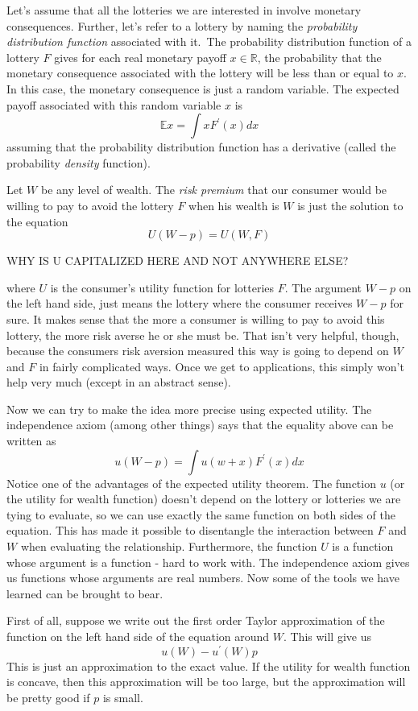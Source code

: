 \documentclass[12pt]{article}
\begin{document}
Let's assume that all the lotteries we are interested in involve monetary
consequences. Further, let's refer to a lottery by naming the \emph{probability
distribution function} associated with it.\ The probability distribution
function of a lottery $F$ gives for each real monetary payoff $x\in\mathbb{R}%
$, the probability that the monetary consequence associated with the lottery
will be less than or equal to $x$. In this case, the monetary consequence is
just a random variable. The expected payoff associated with this random
variable $x$ is%
\[
\mathbb{E}x\mathbb{=}\int xF^{\prime}\left(  x\right)  dx
\]
assuming that the probability distribution function has a derivative (called
the probability \emph{density} function).

Let $W$ be any level of wealth. The \emph{risk premium} that our consumer
would be willing to pay to avoid the lottery $F$ when his wealth is $W$ is
just the solution to the equation%
\[
U\left(  W-p\right)  =U\left(  W,F\right)
\]

WHY IS U CAPITALIZED HERE AND NOT ANYWHERE ELSE?

where $U$ is the consumer's utility function for lotteries $F$. The argument
$W-p$ on the left hand side, just means the lottery where the consumer
receives $W-p$ for sure. It makes sense that the more a consumer is willing to
pay to avoid this lottery, the more risk averse he or she must be. That isn't
very helpful, though, because the consumers risk aversion measured this way is
going to depend on $W$ and $F$ in fairly complicated ways. Once we get to
applications, this simply won't help very much (except in an abstract sense).

Now we can try to make the idea more precise using expected utility. The
independence axiom (among other things) says that the equality above can be
written as%
\[
u\left(  W-p\right)  =\int u\left(  w+x\right)  F^{\prime}\left(  x\right)
dx
\]
Notice one of the advantages of the expected utility theorem. The function $u$
(or the utility for wealth function) doesn't depend on the lottery or
lotteries we are tying to evaluate, so we can use exactly the same function on
both sides of the equation. This has made it possible to disentangle the
interaction between $F$ and $W$ when evaluating the relationship. Furthermore,
the function $U$ is a function whose argument is a function - hard to work
with. The independence axiom gives us functions whose arguments are real
numbers. Now some of the tools we have learned can be brought to bear.

First of all, suppose we write out the first order Taylor approximation of the
function on the left hand side of the equation around $W$. This will give us%
\[
u\left(  W\right)  -u^{\prime}\left(  W\right)  p
\]
This is just an approximation to the exact value. If the utility for wealth
function is concave, then this approximation will be too large, but the
approximation will be pretty good if $p$ is small.
\end{document}
